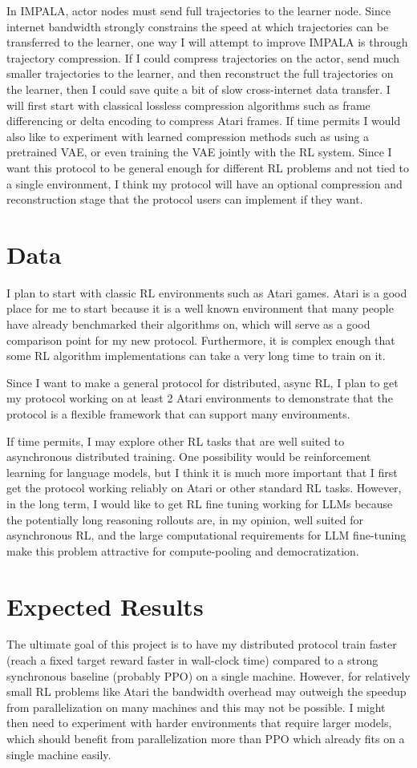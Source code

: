 \documentclass{article}
\begin{document}
In IMPALA, actor nodes must send full trajectories to the learner node. Since internet bandwidth
strongly constrains the speed at which trajectories can be transferred to the learner, one way I will attempt
to improve IMPALA is through trajectory compression. If I could compress trajectories on the actor, send much
smaller trajectories to the learner, and then reconstruct the full trajectories on the learner, then I could
save quite a bit of slow cross-internet data transfer. I will first start with classical lossless compression
algorithms such as frame differencing or delta encoding to compress Atari frames. If time permits I would also
like to experiment with learned compression methods such as using a pretrained VAE, or even training the VAE
jointly with the RL system. Since I want this protocol to be general enough for different RL
problems and not tied to a single environment, I think my protocol will have an optional compression and
reconstruction stage that the protocol users can implement if they want.


\section{Data}
I plan to start with classic RL environments such as Atari games. Atari is a good place for me to start
because it is a well known environment that many people have already benchmarked their algorithms on,
which will serve as a good comparison point for my new protocol. Furthermore, it is complex enough that
some RL algorithm implementations can take a very long time to train on it.

Since I want to make a general protocol for distributed, async RL, I plan to get my protocol working on at least
2 Atari environments to demonstrate that the protocol is a flexible framework that can support many environments.

If time permits, I may explore other RL tasks that are well suited to asynchronous distributed training.
One possibility would be reinforcement learning for language models, but I think it is much more important
that I first get the protocol working reliably on Atari or other standard RL tasks. However, in the long term,
I would like to get RL fine tuning working for LLMs because the potentially long reasoning rollouts are, in my
opinion, well suited for asynchronous RL, and the large computational requirements for LLM fine-tuning make
this problem attractive for compute-pooling and democratization.


\section{Expected Results}
The ultimate goal of this project is to have my distributed protocol train faster (reach a fixed
target reward faster in wall-clock time) compared to a strong synchronous baseline (probably PPO)
on a single machine.
However, for relatively small RL problems like Atari
the bandwidth overhead may outweigh the speedup from parallelization on many machines and this may not
be possible. I might then need to experiment with harder environments that require larger models, which
should benefit from parallelization more than PPO which already fits on a single machine easily.
\end{document}

